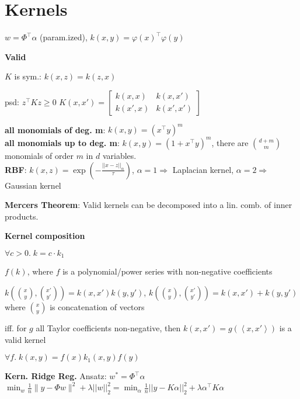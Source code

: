 \section*{Kernels}

$w = \Phi^\top \alpha$ (param.ized), $k(x,y) = \varphi(x)^\top \varphi(y)$


\textbf{Valid} ~ \begin{rowlist}
    \item $K$ is sym.: $k(x,z) = k(z,x)$
    \item psd: $z^\top K z \geq 0$
    $K(x, x') = \begin{bmatrix}
                k(x, x) & k(x, x') \\
                k(x', x) & k(x', x')
                \end{bmatrix}$   
\end{rowlist}

\textbf{all monomials of deg. m}: $k(x,y) = (x^\top y)^m$ \\
\textbf{all monomials up to deg. m}: $k(x,y) = (1+x^\top y)^m$, there are $\binom{d+m}{m}$ monomials of 
order $m$ in $d$ variables.\\

\textbf{RBF}: $k(x, z) = \exp ( -\frac{||x - z||_\alpha}{\tau} )$, $\alpha = 1 \Rightarrow $ Laplacian kernel, $\alpha = 2 \Rightarrow $ Gaussian kernel

\textbf{Mercers Theorem}: Valid kernels can be decomposed into a lin. comb. of inner products.

\textbf{Kernel composition}

\begin{rowlist}
    \item $\forall c > 0. \; k = c \cdot k_1$
    \item $f(k)$, where $f$ is a polynomial/power series with non-negative coefficients
    \item{
        $k(\binom{x}{y}, \binom{x'}{y'})=k(x,x')k(y,y')$, $k(\binom{x}{y}, \binom{x'}{y'})=k(x,x') + k(y,y')$ where $\binom{x}{y}$ is concatenation of vectors
    }
    \item iff. for $g$ all Taylor coefficients non-negative, then $k(x, x') = g(\left< x, x' \right>)$ is a valid kernel
    \item $\forall f. \; k(x,y) = f(x)k_1(x,y)f(y)$
\end{rowlist}

\textbf{Kern. Ridge Reg.}
Ansatz: $w^*=\Phi^\top\alpha$\\
$\min_w \frac1n \|y - \Phi w\|^2 + \lambda ||w||_2^2 = \min_\alpha \frac1n ||y - K\alpha||_2^2 + \lambda \alpha^\top K \alpha$
